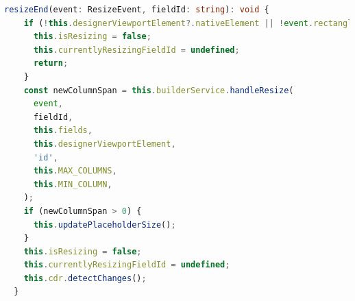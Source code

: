 \documentclass[a4paper,11pt]{article}
\begin{document}
\renewcommand{\lstlistingname}{\texttt{Aufruf von handleResize in Canvas Kompopnente}}
\begin{lstlisting}[language=TypeScript, caption={\texttt{handleSimpleDrop} function}]
  resizeEnd(event: ResizeEvent, fieldId: string): void {
    if (!this.designerViewportElement?.nativeElement || !event.rectangle?.width) {
      this.isResizing = false;
      this.currentlyResizingFieldId = undefined;
      return;
    }
    const newColumnSpan = this.builderService.handleResize(
      event,
      fieldId,
      this.fields,
      this.designerViewportElement,
      'id',
      this.MAX_COLUMNS,
      this.MIN_COLUMN,
    );
    if (newColumnSpan > 0) {
      this.updatePlaceholderSize();
    }
    this.isResizing = false;
    this.currentlyResizingFieldId = undefined;
    this.cdr.detectChanges();
  }
\end{lstlisting}
\end{document}
